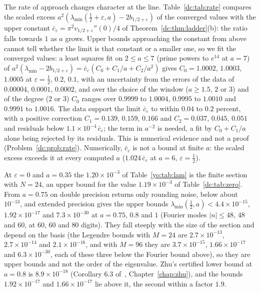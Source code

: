 The rate of approach changes character at the line. Table~\ref{dc:tab:rate} compares the scaled excess $a^2(\lambda_{\min}(\frac12+\varepsilon,a)-2b_{1/2+\varepsilon})$ of the converged values with the upper constant $\bar c_\varepsilon=\pi^2v_{1/2+\varepsilon}''(0)/4$ of Theorem~\ref{dc:thm:ladder}(b): the ratio falls towards $1$ as $a$ grows. Upper bounds approaching the constant from above cannot tell whether the limit is that constant or a smaller one, so we fit the converged values: a least squares fit on $2\le a\le7$ (prime powers to $e^{14}$ at $a=7$) of $a^2(\lambda_{\min}-2b_{1/2+\varepsilon})=\bar c_\varepsilon(C_0+C_1/a+C_2/a^2)$ gives $C_0=1.0002$, $1.0003$, $1.0005$ at $\varepsilon=\frac12$, $0.2$, $0.1$, with an uncertainty from the errors of the data of $0.00004$, $0.0001$, $0.0002$, and over the choice of the window ($a\ge1.5$, $2$ or $3$) and of the degree ($2$ or $3$) $C_0$ ranges over $0.9999$ to $1.0004$, $0.9995$ to $1.0010$ and $0.9991$ to $1.0016$. The data support the limit $\bar c_\varepsilon$ to within $0.04$ to $0.2$ percent, with a positive correction $C_1=0.139$, $0.159$, $0.166$ and $C_2=0.037$, $0.045$, $0.051$ and residuals below $1.1\times10^{-4}\,\bar c_\varepsilon$; the term in $a^{-2}$ is needed, a fit by $C_0+C_1/a$ alone being rejected by its residuals. This is numerical evidence and not a proof (Problem~\ref{dc:prob:rate}). Numerically, $\bar c_\varepsilon$ is not a bound at finite $a$: the scaled excess exceeds it at every computed $a$ ($1.024\,\bar c_\varepsilon$ at $a=6$, $\varepsilon=\frac12$).

At $\varepsilon=0$ and $a=0.35$ the $1.20\times10^{-3}$ of Table~\ref{yo:tab:lam} is the finite section with $N=24$, an upper bound for the value $1.19\times10^{-3}$ of Table~\ref{dc:tab:zero}. From $a=0.75$ on double precision returns only rounding noise, below about $10^{-13}$, and extended precision gives the upper bounds $\lambda_{\min}(\frac12,a)<4.4\times10^{-15}$, $1.92\times10^{-17}$ and $7.3\times10^{-30}$ at $a=0.75$, $0.8$ and $1$ (Fourier modes $|n|\le48$, $48$ and $60$, at $60$, $60$ and $80$ digits). They fall steeply with the size of the section and depend on the basis (the Legendre bounds with $M=24$ are $2.7\times10^{-13}$, $2.7\times10^{-14}$ and $2.1\times10^{-16}$, and with $M=96$ they are $3.7\times10^{-15}$, $1.66\times10^{-17}$ and $6.3\times10^{-30}$, each of these three below the Fourier bound above), so they are upper bounds and not the order of the eigenvalue. Zhu's certified lower bound at $a=0.8$ is $8.9\times10^{-18}$ (Corollary 6.3 of~\cite{Zhu26}, Chapter~\ref{chap:zhu}), and the bounds $1.92\times10^{-17}$ and $1.66\times10^{-17}$ lie above it, the second within a factor $1.9$.

